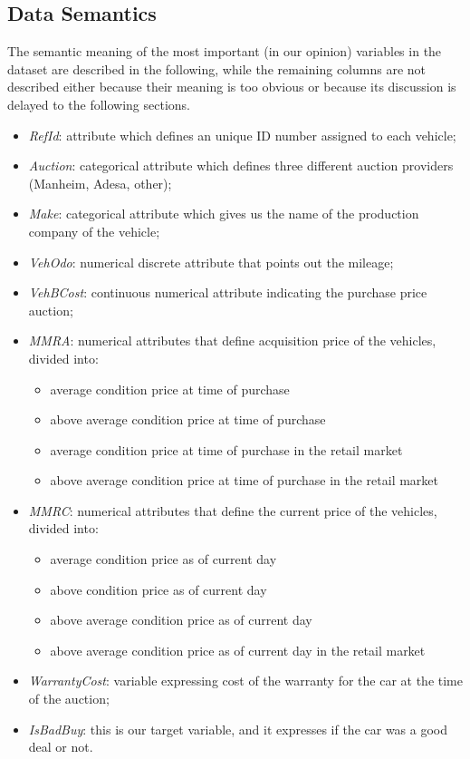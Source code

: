 \documentclass{article}
\begin{document}
	\subsection{Data Semantics}
	\label{sec:dataSemantics}
	The semantic meaning of the most important (in our opinion) variables in the dataset are described in the following, while the remaining columns are not described either because their meaning is too obvious or because its discussion is delayed to the following sections.\begin{itemize}
		\item \emph{RefId}: attribute which defines an unique ID number assigned to each vehicle;
		\item \emph{Auction}: categorical attribute which defines three different auction providers (Manheim, Adesa, other);
		\item \emph{Make}: categorical attribute which gives us the name of the production company of the vehicle;
		\item \emph{VehOdo}: numerical discrete attribute that points out the mileage;
		\item \emph{VehBCost}: continuous numerical attribute indicating the purchase price auction;
		\item \emph{MMRA}: numerical attributes that define acquisition price of the vehicles, divided into:
		\begin{itemize}
			\item average condition price at time of purchase 
			\item above average condition price at time of purchase
			\item average condition price at time of purchase in the retail market
			\item above average condition price at time of purchase in the retail market 
		\end{itemize}
		\item \emph{MMRC}: numerical attributes that define the current price of the vehicles, divided into:
		\begin{itemize}
			\item average condition price as of current day 
			\item above condition price as of current day
			\item above average condition price as of current day
			\item above average condition  price as of current day in the retail market
		\end{itemize}
		\item \emph{WarrantyCost}: variable expressing cost of the warranty for the car at the time of the auction;
		\item \emph{IsBadBuy}: this is our target variable, and it expresses if the car was a good deal or not.
	\end{itemize}
	
\end{document}
